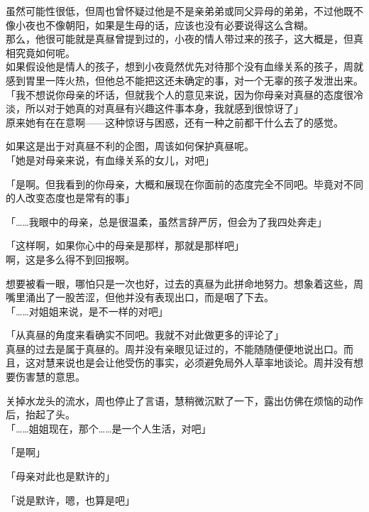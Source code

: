 虽然可能性很低，但周也曾怀疑过他是不是亲弟弟或同父异母的弟弟，不过他既不像小夜也不像朝阳，如果是生母的话，应该也没有必要说得这么含糊。\\

那么，他很可能就是真昼曾提到过的，小夜的情人带过来的孩子，这大概是，但真相究竟如何呢。\\

如果假设他是情人的孩子，想到小夜竟然优先对待那个没有血缘关系的孩子，周就感到胃里一阵火热，但他总不能把这还未确定的事，对一个无辜的孩子发泄出来。\\

「我不想说你母亲的坏话，但就我个人的意见来说，因为你母亲对真昼的态度很冷淡，所以对于她真的对真昼有兴趣这件事本身，我就感到很惊讶了」\\

原来她有在在意啊——这种惊讶与困惑，还有一种之前都干什么去了的感觉。

如果这是出于对真昼不利的企图，周该如何保护真昼呢。\\

「她是对母亲来说，有血缘关系的女儿，对吧」

「是啊。但我看到的你母亲，大概和展现在你面前的态度完全不同吧。毕竟对不同的人改变态度也是常有的事」

「……我眼中的母亲，总是很温柔，虽然言辞严厉，但会为了我四处奔走」

「这样啊，如果你心中的母亲是那样，那就是那样吧」\\

啊，这是多么得不到回报啊。

想要被看一眼，哪怕只是一次也好，过去的真昼为此拼命地努力。想象着这些，周嘴里涌出了一股苦涩，但他并没有表现出口，而是咽了下去。\\

「……对姐姐来说，是不一样的对吧」

「从真昼的角度来看确实不同吧。我就不对此做更多的评论了」\\

真昼的过去是属于真昼的。周并没有亲眼见证过的，不能随随便便地说出口。而且，这对慧来说也是会让他受伤的事实，必须避免局外人草率地谈论。周并没有想要伤害慧的意思。

关掉水龙头的流水，周也停止了言语，慧稍微沉默了一下，露出仿佛在烦恼的动作后，抬起了头。\\

「……姐姐现在，那个……是一个人生活，对吧」

「是啊」

「母亲对此也是默许的」

「说是默许，嗯，也算是吧」\\

